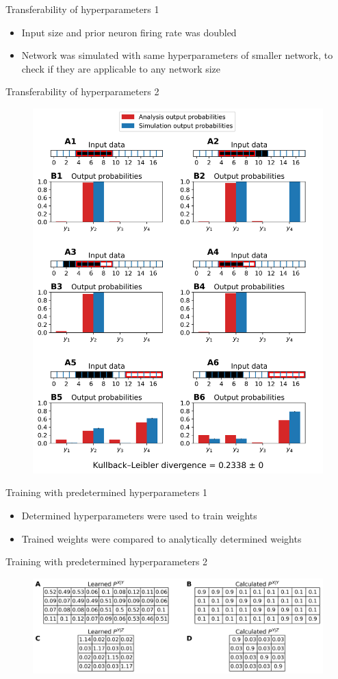 \documentclass[aspectratio=169]{beamer}
\begin{document}
\begin{frame}{Transferability of hyperparameters 1}
  \begin{itemize}
    \item Input size and prior neuron firing rate  was doubled
    \item Network was simulated with same hyperparameters of smaller network, to check if they are applicable to any network size
  \end{itemize}
\end{frame}

\begin{frame}{Transferability of hyperparameters 2}
 \vspace{-1.0cm}
		\begin{figure}
        \includegraphics[width=0.4\linewidth]{../Latex/figures/1D/doubleSize/doubleSize_98_880_4.png}
      \end{figure} 
\end{frame}



\begin{frame}{Training with predetermined hyperparameters 1}
  \begin{itemize}
    \item Determined hyperparameters were used to train weights
    \item Trained weights were compared to analytically determined weights
  \end{itemize}
\end{frame}

\begin{frame}{Training with predetermined hyperparameters 2}
 \vspace{-1.0cm}
		\begin{figure}
        \includegraphics[width=0.7\linewidth]{../Latex/figures/1D/training/weightComparison.png}
      \end{figure} 
\end{frame}
\end{document}
